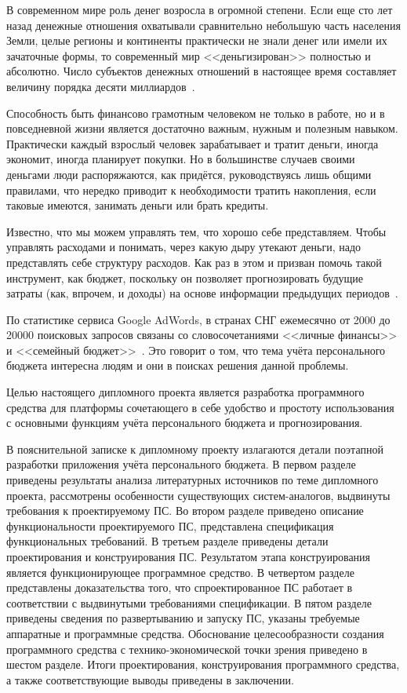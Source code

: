 \label{sec:introduction}

В современном мире роль денег возросла в огромной степени.
Если еще сто лет назад денежные отношения охватывали сравнительно небольшую часть населения Земли, целые регионы и континенты практически не знали денег или имели их зачаточные формы, то современный мир <<деньгизирован>> полностью и абсолютно.
Число субъектов денежных отношений в настоящее время составляет величину порядка десяти миллиардов~\cite{money_sorgin}.

Способность быть финансово грамотным человеком не только в работе, но и в повседневной жизни является достаточно важным, нужным и полезным навыком.
Практически каждый взрослый человек зарабатывает и тратит деньги, иногда экономит, иногда планирует покупки.
Но в большинстве случаев своими деньгами люди распоряжаются, как придётся, руководствуясь лишь общими правилами, что нередко приводит к необходимости тратить накопления, если таковые имеются, занимать деньги или брать кредиты.

Известно, что мы можем управлять тем, что хорошо себе представляем.
Чтобы управлять расходами и понимать, через какую дыру утекают деньги, надо представлять себе структуру расходов.
Как раз в этом и призван помочь такой инструмент, как бюджет, поскольку он позволяет прогнозировать будущие затраты (как, впрочем, и доходы) на основе информации предыдущих периодов~\cite{money_under_control}.

По статистике сервиса Google AdWords, в странах СНГ ежемесячно от 2000 до 20000 поисковых запросов связаны со словосочетаниями <<личные финансы>> и <<семейный бюджет>>~\cite{google_adwords}.
Это говорит о том, что тема учёта персонального бюджета интересна людям и они в поисках решения данной проблемы.

Целью настоящего дипломного проекта является разработка программного средства для платформы \andro сочетающего в себе удобство и простоту использования с основными функциям учёта персонального бюджета и прогнозирования.

В пояснительной записке к дипломному проекту излагаются детали поэтапной разработки приложения учёта персонального бюджета.
В первом разделе приведены результаты анализа литературных источников по теме дипломного проекта, рассмотрены особенности существующих систем-аналогов, выдвинуты требования к проектируемому ПС.
Во втором разделе приведено описание функциональности проектируемого ПС, представлена спецификация функциональных требований.
В третьем разделе приведены детали проектирования и конструирования ПС.
Результатом этапа конструирования является функционирующее программное средство.
В четвертом разделе представлены доказательства того, что спроектированное ПС работает в соответствии с выдвинутыми требованиями спецификации.
В пятом разделе приведены сведения по развертыванию и запуску ПС, указаны требуемые аппаратные и программные средства.
Обоснование целесообразности создания программного средства с технико-экономической точки зрения приведено в шестом разделе.
Итоги проектирования, конструирования программного средства, а также соответствующие выводы приведены в заключении.
